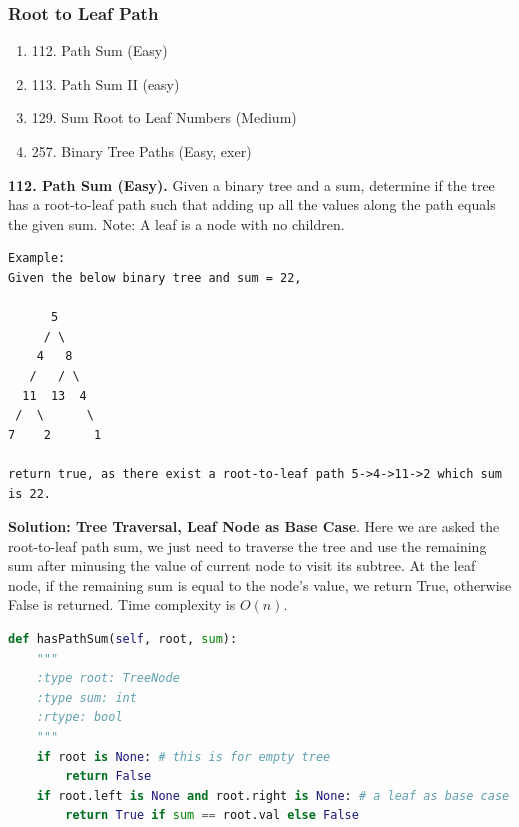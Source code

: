 \documentclass[../main.tex]{subfiles}
\begin{document}
\subsubsection{Root to Leaf Path}
\begin{enumerate}
    \item 112. Path Sum (Easy)
    \item 113. Path Sum II (easy)
    \item 129. Sum Root to Leaf Numbers (Medium)
    \item 257. Binary Tree Paths (Easy, exer) 
\end{enumerate}
\begin{examples}[resume]
\item \textbf{112. Path Sum (Easy).} Given a binary tree and a sum, determine if the tree has a root-to-leaf path such that adding up all the values along the path equals the given sum. Note: A leaf is a node with no children.
\begin{lstlisting}[numbers=none]
Example:
Given the below binary tree and sum = 22,

      5
     / \
    4   8
   /   / \
  11  13  4
 /  \      \
7    2      1

return true, as there exist a root-to-leaf path 5->4->11->2 which sum is 22.
\end{lstlisting}
\textbf{Solution: Tree Traversal, Leaf Node as Base Case}. Here we are asked the root-to-leaf path sum, we just need to traverse the tree and use the remaining sum after minusing the value of current node to visit its subtree. At the leaf node, if the remaining sum is equal to the node's value, we return True, otherwise False is returned.  Time complexity is $O(n)$.
\begin{lstlisting}[language=Python]
def hasPathSum(self, root, sum):
    """
    :type root: TreeNode
    :type sum: int
    :rtype: bool
    """
    if root is None: # this is for empty tree
        return False
    if root.left is None and root.right is None: # a leaf as base case
        return True if sum == root.val else False


\end{lstlisting}
\end{examples}
\end{document}
